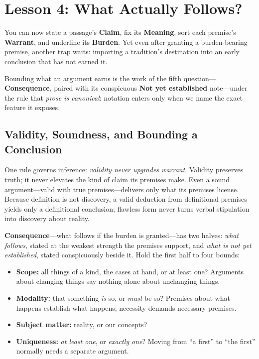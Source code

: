 \section{Lesson 4: What Actually Follows?}

You can now state a passage's \textbf{Claim}, fix its \textbf{Meaning}, sort each premise's \textbf{Warrant}, and underline its \textbf{Burden}. Yet even after granting a burden-bearing premise, another trap waits: importing a tradition's destination into an early conclusion that has not earned it.

Bounding what an argument earns is the work of the fifth question---\textbf{Consequence}, paired with its conspicuous \textbf{Not yet established} note---under the rule that \emph{prose is canonical}: notation enters only when we name the exact feature it exposes.

\subsection{Validity, Soundness, and Bounding a Conclusion}

One rule governs inference: \emph{validity never upgrades warrant}. Validity preserves truth; it never elevates the kind of claim its premises make. Even a sound argument---valid with true premises---delivers only what its premises license. Because definition is not discovery, a valid deduction from definitional premises yields only a definitional conclusion; flawless form never turns verbal stipulation into discovery about reality.

\textbf{Consequence}---what follows if the burden is granted---has two halves: \emph{what follows}, stated at the weakest strength the premises support, and \emph{what is not yet established}, stated conspicuously beside it. Hold the first half to four bounds:
\begin{itemize}
\item \textbf{Scope:} all things of a kind, the cases at hand, or at least one? Arguments about changing things say nothing alone about unchanging things.
\item \textbf{Modality:} that something \emph{is} so, or \emph{must} be so? Premises about what happens establish what happens; necessity demands necessary premises.
\item \textbf{Subject matter:} reality, or our concepts?
\item \textbf{Uniqueness:} \emph{at least one}, or \emph{exactly one}? Moving from ``a first'' to ``the first'' normally needs a separate argument.
\end{itemize}

